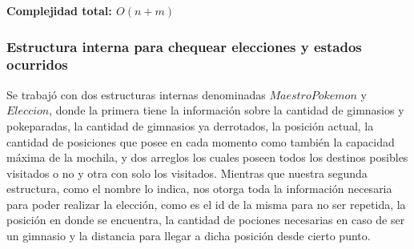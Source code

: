 \begin{algorithm}[H]
\textbf{\hfill Complejidad total: $O(n+m)$}\\ 
\end{algorithm}

\subsubsection*{Estructura interna para chequear elecciones y estados ocurridos}

Se trabajó con dos estructuras internas denominadas $MaestroPokemon$ y $Eleccion$, donde la primera tiene la informaci\'on sobre la cantidad de gimnasios y pokeparadas, la cantidad de gimnasios ya derrotados, la posici\'on actual, la cantidad de posiciones que posee en cada momento como tambi\'en la capacidad m\'axima de la mochila, y dos arreglos los cuales poseen todos los destinos posibles visitados o no y otra con solo los visitados.
Mientras que nuestra segunda estructura, como el nombre lo indica, nos otorga toda la informaci\'on necesaria para poder realizar la elecci\'on, como es el id de la misma para no ser repetida, la posici\'on en donde se encuentra, la cantidad de pociones necesarias en caso de ser un gimnasio y la distancia para llegar a dicha posici\'on desde cierto punto.

